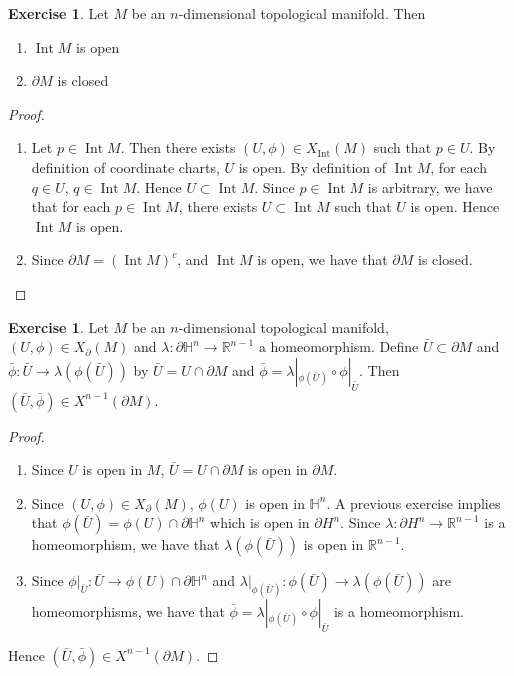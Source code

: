 \documentclass{book}
\theoremstyle{definition}
\newtheorem{ex}[definition]{Exercise}
\newcommand{\lam}{\lambda}
\renewcommand{\H}{\mathbb{H}}
\newcommand{\R}{\mathbb{R}}
\DeclareMathOperator{\Int}{Int}
\DeclareMathOperator*{\0}{\mbf{0}}
\DeclareMathOperator*{\1}{\mbf{1}}
\newcommand{\p}{\partial}
\begin{document}
	\begin{ex}
		Let $M$ be an $n$-dimensional topological manifold. Then 
		\begin{enumerate}
			\item $\Int M$ is open
			\item $\p M$ is closed
		\end{enumerate}
	\end{ex}

	\begin{proof}\
		\begin{enumerate}
			\item Let $p \in \Int M$. Then there exists $(U, \phi) \in X_{\Int}(M)$ such that $p \in U$. By definition of coordinate charts, $U$ is open. By definition of $\Int M$, for each $q \in U$, $q \in \Int M$. Hence $U \subset \Int M$. Since $p \in \Int M$ is arbitrary, we have that for each $p \in \Int M$, there exists $U \subset \Int M$ such that $U$ is open. Hence $\Int M$ is open. 
			\item Since $\p M = (\Int M)^c$, and $\Int M$ is open, we have that $\p M$ is closed.
		\end{enumerate}
	\end{proof}

	\begin{ex}
		Let $M$ be an $n$-dimensional topological manifold, $(U, \phi) \in X_{\p}(M)$ and $\lam: \p \H^n \rightarrow \R^{n-1}$ a homeomorphism. Define $\bar{U} \subset \p M$ and $\bar{\phi}: \bar{U} \rightarrow \lam(\phi(\bar{U})) $ by $\bar{U} = U \cap \p M$ and $\bar{\phi} = \lam|_{\phi(\bar{U})} \circ \phi|_{\bar{U}}$. Then $(\bar{U}, \bar{\phi}) \in X^{n-1}(\p M)$.
	\end{ex}

	\begin{proof}\
		\begin{enumerate}
			\item Since $U$ is open in $M$, $\bar{U} = U \cap \p M$ is open in $\p M$. 
			\item Since $(U, \phi) \in X_{\p}(M)$, $\phi(U)$ is open in $\H^n$. A previous exercise implies that $\phi(\bar{U}) = \phi(U) \cap \p \H^n$ which is open in $\p H^n$. Since $\lam: \p H^n \rightarrow \R^{n-1}$ is a homeomorphism, we have that $\lam(\phi(\bar{U}))$ is open in $\R^{n-1}$. 
			\item Since $\phi|_{\bar{U}}: \bar{U} \rightarrow \phi(U) \cap \p \H^n$ and $\lam|_{\phi(\bar{U})} : \phi(\bar{U}) \rightarrow \lam(\phi(\bar{U})) $ are homeomorphisms, we have that $\bar{\phi} = \lam|_{\phi(\bar{U})} \circ \phi|_{\bar{U}}$ is a homeomorphism.
		\end{enumerate}
		Hence $(\bar{U}, \bar{\phi}) \in  X^{n-1}(\p M)$.
	\end{proof}
\end{document}
